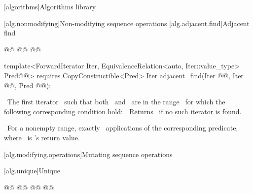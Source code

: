 \documentclass[american,twoside]{book}
\begin{document}
\renewcommand{\sectionmark}[1]{\markright{\thesection\hspace{1em}#1}}
\renewcommand{\chaptermark}[1]{\markboth{#1}{}}

\color{black}

\setcounter{chapter}{24}
[algorithms]{Algorithms library}

\begin{paras}
%


[alg.nonmodifying]{Non-modifying sequence operations}
\setcounter{subsection}{7}
[alg.adjacent.find]{Adjacent find}

%
\begin{itemdecl}
@@
  @@
  @@

template<ForwardIterator Iter,
         EquivalenceRelation<auto, Iter::value_type> Pred@@>
  requires CopyConstructible<Pred>
  Iter adjacent_find(Iter @@, Iter @@, 
                     Pred @@);
\end{itemdecl}

\begin{itemdescr}
\pnum
\returns\ 
The first iterator
\
such that both
\tcode{i}\
and
\
are in
the range
\
for which
the following corresponding condition hold:
.
Returns \farg{last}\
if no such iterator is found.

\pnum
\complexity\ 
For a nonempty range, exactly
\
applications of the corresponding predicate, where \ is
\tcode{adjacent_find}'s
return value.
\end{itemdescr}

\rSec1[alg.modifying.operations]{Mutating sequence operations}

\setcounter{subsection}{8}
\rSec2[alg.unique]{Unique}

%
\begin{itemdecl}
@@
  @@
        @@
  @@


\end{itemdecl}
\end{paras}
\end{document}

